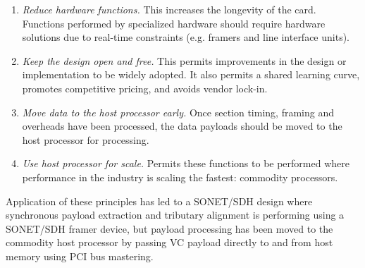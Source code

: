 \documentclass[letterpaper,final,notitlepage,twocolumn,10pt,twoside]{article}
\makeatletter
\renewcommand\subsubsection{\@startsection{subsubsection}{3}{\z@}%
                                     {-1.25ex\@plus -.5ex \@minus -.2ex}%
                                     {1ex \@plus .2ex}%
                                     {\normalfont\normalsize\bfseries}}
\makeatother
\begin{document}
\begin{enumerate}
	\item \textsl{Reduce hardware functions.}
		This increases the longevity of the card.  Functions performed
		by specialized hardware should require hardware solutions due to
		real-time constraints (e.g. framers and line interface units).
	\item \textsl{Keep the design open and free.}
		This permits improvements in the design or implementation to be
		widely adopted.  It also permits a shared learning curve,
		promotes competitive pricing, and avoids vendor lock-in.
	\item \textsl{Move data to the host processor early.}
		Once section timing, framing and overheads have been processed,
		the data payloads should be moved to the host processor for
		processing.
	\item \textsl{Use host processor for scale.}
		Permits these functions to be performed where performance in the
		industry is scaling the fastest: commodity processors.
\end{enumerate}

Application of these principles has led to a SONET/SDH design where synchronous
payload extraction and tributary alignment is performing using a SONET/SDH
framer device, but payload processing has been moved to the commodity host
processor by passing VC payload directly to and from host memory using PCI bus
mastering.

% 
\end{document}
